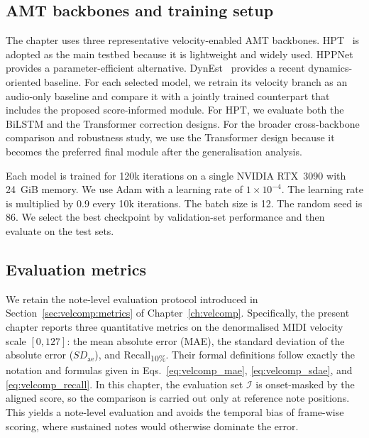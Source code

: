 \subsection{AMT backbones and training setup}
\label{sec:scoreinf:training}

The chapter uses three representative velocity-enabled AMT backbones. HPT~\cite{kong2021hpt} is adopted as the main testbed because it is lightweight and widely used. HPPNet~\cite{wei2022hppnet} provides a parameter-efficient alternative. DynEst~\cite{he2026dynest} provides a recent dynamics-oriented baseline. For each selected model, we retrain its velocity branch as an audio-only baseline and compare it with a jointly trained counterpart that includes the proposed score-informed module. For HPT, we evaluate both the BiLSTM and the Transformer correction designs. For the broader cross-backbone comparison and robustness study, we use the Transformer design because it becomes the preferred final module after the generalisation analysis.

Each model is trained for 120k iterations on a single NVIDIA RTX~3090 with 24~GiB memory. We use Adam with a learning rate of $1\times10^{-4}$. The learning rate is multiplied by $0.9$ every 10k iterations. The batch size is 12. The random seed is 86. We select the best checkpoint by validation-set performance and then evaluate on the test sets.

\subsection{Evaluation metrics}
\label{sec:scoreinf:metrics}

We retain the note-level evaluation protocol introduced in Section~\ref{sec:velcomp:metrics} of Chapter~\ref{ch:velcomp}. Specifically, the present chapter reports three quantitative metrics on the denormalised MIDI velocity scale $[0,127]$: the mean absolute error (MAE), the standard deviation of the absolute error ($SD_{\mathrm{ae}}$), and Recall\textsubscript{10\%}. Their formal definitions follow exactly the notation and formulas given in Eqs.~\eqref{eq:velcomp_mae}, \eqref{eq:velcomp_sdae}, and \eqref{eq:velcomp_recall}. In this chapter, the evaluation set \(\mathcal{I}\) is onset-masked by the aligned score, so the comparison is carried out only at reference note positions. This yields a note-level evaluation and avoids the temporal bias of frame-wise scoring, where sustained notes would otherwise dominate the error.


